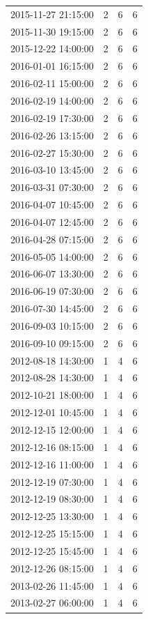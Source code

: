 \begin{tabular}{lrrr}
2015-11-27 21:15:00 & 2 & 6 & 6 \\
2015-11-30 19:15:00 & 2 & 6 & 6 \\
2015-12-22 14:00:00 & 2 & 6 & 6 \\
2016-01-01 16:15:00 & 2 & 6 & 6 \\
2016-02-11 15:00:00 & 2 & 6 & 6 \\
2016-02-19 14:00:00 & 2 & 6 & 6 \\
2016-02-19 17:30:00 & 2 & 6 & 6 \\
2016-02-26 13:15:00 & 2 & 6 & 6 \\
2016-02-27 15:30:00 & 2 & 6 & 6 \\
2016-03-10 13:45:00 & 2 & 6 & 6 \\
2016-03-31 07:30:00 & 2 & 6 & 6 \\
2016-04-07 10:45:00 & 2 & 6 & 6 \\
2016-04-07 12:45:00 & 2 & 6 & 6 \\
2016-04-28 07:15:00 & 2 & 6 & 6 \\
2016-05-05 14:00:00 & 2 & 6 & 6 \\
2016-06-07 13:30:00 & 2 & 6 & 6 \\
2016-06-19 07:30:00 & 2 & 6 & 6 \\
2016-07-30 14:45:00 & 2 & 6 & 6 \\
2016-09-03 10:15:00 & 2 & 6 & 6 \\
2016-09-10 09:15:00 & 2 & 6 & 6 \\
2012-08-18 14:30:00 & 1 & 4 & 6 \\
2012-08-28 14:30:00 & 1 & 4 & 6 \\
2012-10-21 18:00:00 & 1 & 4 & 6 \\
2012-12-01 10:45:00 & 1 & 4 & 6 \\
2012-12-15 12:00:00 & 1 & 4 & 6 \\
2012-12-16 08:15:00 & 1 & 4 & 6 \\
2012-12-16 11:00:00 & 1 & 4 & 6 \\
2012-12-19 07:30:00 & 1 & 4 & 6 \\
2012-12-19 08:30:00 & 1 & 4 & 6 \\
2012-12-25 13:30:00 & 1 & 4 & 6 \\
2012-12-25 15:15:00 & 1 & 4 & 6 \\
2012-12-25 15:45:00 & 1 & 4 & 6 \\
2012-12-26 08:15:00 & 1 & 4 & 6 \\
2013-02-26 11:45:00 & 1 & 4 & 6 \\
2013-02-27 06:00:00 & 1 & 4 & 6 \\

\end{tabular}

